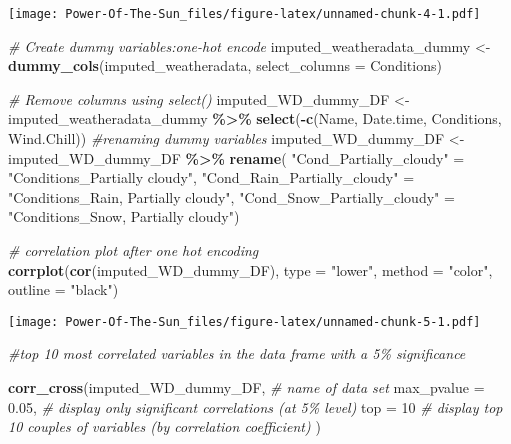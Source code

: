 \documentclass[
]{article}
\newenvironment{Shaded}{\begin{snugshade}}{\end{snugshade}}
\newcommand{\AttributeTok}[1]{\textcolor[rgb]{0.13,0.29,0.53}{#1}}
\newcommand{\CommentTok}[1]{\textcolor[rgb]{0.56,0.35,0.01}{\textit{#1}}}
\newcommand{\DecValTok}[1]{\textcolor[rgb]{0.00,0.00,0.81}{#1}}
\newcommand{\FloatTok}[1]{\textcolor[rgb]{0.00,0.00,0.81}{#1}}
\newcommand{\FunctionTok}[1]{\textcolor[rgb]{0.13,0.29,0.53}{\textbf{#1}}}
\newcommand{\NormalTok}[1]{#1}
\newcommand{\OtherTok}[1]{\textcolor[rgb]{0.56,0.35,0.01}{#1}}
\newcommand{\SpecialCharTok}[1]{\textcolor[rgb]{0.81,0.36,0.00}{\textbf{#1}}}
\newcommand{\StringTok}[1]{\textcolor[rgb]{0.31,0.60,0.02}{#1}}
\begin{document}
\texttt{[image: Power-Of-The-Sun\_files/figure-latex/unnamed-chunk-4-1.pdf]}

\begin{Shaded}
\begin{Highlighting}[]
\CommentTok{\# Create dummy variables:one{-}hot encode }
\NormalTok{imputed\_weatheradata\_dummy }\OtherTok{\textless{}{-}} \FunctionTok{dummy\_cols}\NormalTok{(imputed\_weatheradata, }
                                         \AttributeTok{select\_columns =} \StringTok{\textquotesingle{}Conditions\textquotesingle{}}\NormalTok{)}



\CommentTok{\# Remove columns using select()}
\NormalTok{imputed\_WD\_dummy\_DF }\OtherTok{\textless{}{-}}\NormalTok{ imputed\_weatheradata\_dummy }\SpecialCharTok{\%\textgreater{}\%} \FunctionTok{select}\NormalTok{(}\SpecialCharTok{{-}}\FunctionTok{c}\NormalTok{(Name, }
\NormalTok{                                                                Date.time, }
\NormalTok{                                                                Conditions,}
\NormalTok{                                                                Wind.Chill))}
\CommentTok{\#renaming dummy variables }
\NormalTok{imputed\_WD\_dummy\_DF }\OtherTok{\textless{}{-}}\NormalTok{ imputed\_WD\_dummy\_DF }\SpecialCharTok{\%\textgreater{}\%} 
        \FunctionTok{rename}\NormalTok{( }\StringTok{"Cond\_Partially\_cloudy"} \OtherTok{=} \StringTok{"Conditions\_Partially cloudy"}\NormalTok{,}
                \StringTok{"Cond\_Rain\_Partially\_cloudy"} \OtherTok{=} \StringTok{"Conditions\_Rain, Partially cloudy"}\NormalTok{,}
                \StringTok{"Cond\_Snow\_Partially\_cloudy"} \OtherTok{=} \StringTok{"Conditions\_Snow, Partially cloudy"}\NormalTok{)}

\CommentTok{\# correlation plot after one hot encoding }
\FunctionTok{corrplot}\NormalTok{(}\FunctionTok{cor}\NormalTok{(imputed\_WD\_dummy\_DF), }
         \AttributeTok{type =} \StringTok{"lower"}\NormalTok{,}
         \AttributeTok{method =} \StringTok{"color"}\NormalTok{,}
         \AttributeTok{outline =} \StringTok{"black"}\NormalTok{)}
\end{Highlighting}
\end{Shaded}

\texttt{[image: Power-Of-The-Sun\_files/figure-latex/unnamed-chunk-5-1.pdf]}

\begin{Shaded}
\begin{Highlighting}[]
\CommentTok{\#top 10 most correlated variables in the data frame with a 5\% significance }

\FunctionTok{corr\_cross}\NormalTok{(imputed\_WD\_dummy\_DF, }\CommentTok{\# name of data set}
  \AttributeTok{max\_pvalue =} \FloatTok{0.05}\NormalTok{, }\CommentTok{\# display only significant correlations (at 5\% level)}
  \AttributeTok{top =} \DecValTok{10} \CommentTok{\# display top 10 couples of variables (by correlation coefficient)}
\NormalTok{  )}
\end{Highlighting}
\end{Shaded}
\end{document}
